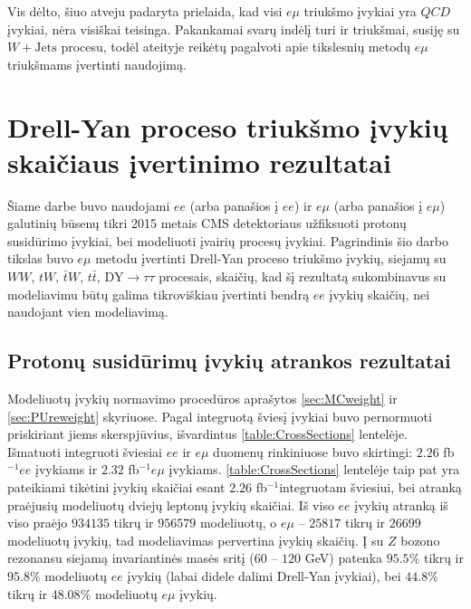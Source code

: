 \documentclass[a4paper, 12pt]{article}
\newcommand{\WW}{W\! W}
\newcommand{\emu}{e\mu}
\newcommand{\WJets}{W\! +\!\mathrm{Jets}}
\newcommand{\DYtau}{\mathrm{DY} \! \rightarrow \! \tau\tau}
\newcommand{\invfb}{fb$^{-1}$}
\begin{document}
Vis dėlto, šiuo atveju padaryta prielaida, kad visi $\emu$ triukšmo įvykiai yra $QCD$ įvykiai, nėra visiškai teisinga.
Pakankamai svarų indėlį turi ir triukšmai, susiję su $\WJets$ procesu, todėl ateityje reikėtų pagalvoti apie tikslesnių
metodų $e\mu$ triukšmams įvertinti naudojimą.

\section{Drell-Yan proceso triukšmo įvykių skaičiaus įvertinimo rezultatai}

Šiame darbe buvo naudojami $ee$ (arba panašios į $ee$) ir $e\mu$ (arba panašios į $e\mu$) galutinių būsenų tikri 2015 metais CMS detektoriaus užfiksuoti protonų susidūrimo įvykiai, bei modeliuoti įvairių procesų įvykiai. Pagrindinis šio darbo tikslas buvo $e\mu$ metodu įvertinti Drell-Yan proceso triukšmo įvykių, siejamų su $\WW$, $tW$, $\bar{t}W$, $t\bar{t}$, $\DYtau$ procesais, skaičių, kad šį rezultatą sukombinavus su modeliavimu būtų galima tikroviškiau įvertinti bendrą $ee$ įvykių skaičių, nei naudojant vien modeliavimą.

\vspace{-0.35cm}
\subsection{Protonų susidūrimų įvykių atrankos rezultatai} \label{sec:ppResults}
\vspace{-0.2cm}

Modeliuotų įvykių normavimo procedūros aprašytos \ref{sec:MCweight} ir \ref{sec:PUreweight} skyriuose. Pagal integruotą šviesį įvykiai buvo pernormuoti priskiriant jiems skerspjūvius, išvardintus \ref{table:CrossSections} lentelėje. Išmatuoti integruoti šviesiai $ee$ ir $e\mu$ duomenų rinkiniuose buvo skirtingi: $2.26$ \invfb  $ee$ įvykiams ir $2.32$ \invfb  $e\mu$ įvykiams. \ref{table:CrossSections} lentelėje taip pat yra pateikiami tikėtini įvykių skaičiai esant $2.26$ \invfb integruotam šviesiui, bei atranką praėjusių modeliuotų dviejų leptonų įvykių skaičiai. Iš viso $ee$ įvykių atranką iš viso praėjo $934135$ tikrų ir $956579$ modeliuotų, o $e\mu$ -- $25817$ tikrų ir $26699$ modeliuotų įvykių, tad modeliavimas pervertina įvykių skaičių. Į su $Z$ bozono rezonansu siejamą invariantinės masės sritį ($60$ -- $120$ GeV) patenka $95.5\%$ tikrų ir $95.8\%$ modeliuotų $ee$ įvykių (labai didele dalimi Drell-Yan įvykiai), bei $44.8\%$ tikrų ir $48.08\%$ modeliuotų $e\mu$ įvykių. 
\end{document}
